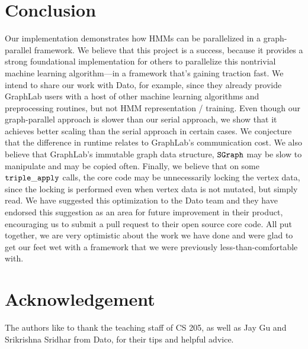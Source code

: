 \section{Conclusion}

Our implementation demonstrates how HMMs can be parallelized in a
graph-parallel framework.  We believe that this project is a success, because it provides a strong foundational implementation for others to parallelize this nontrivial machine learning algorithm---in a framework that's gaining traction fast.   We intend to share our work with Dato, for example, since they already provide GraphLab users with a host of other machine learning algorithms and preprocessing routines, but not HMM representation / training.  Even though our graph-parallel approach is slower than
our serial approach, we show that it achieves better scaling than the serial
approach in certain cases. We conjecture that the difference in runtime relates to GraphLab's communication cost.  We also believe that GraphLab's immutable graph data structure, $\tt{SGraph}$ may be slow to manipulate and may be copied often.  Finally, we  believe that on some $\tt{triple\_apply}$ calls, the core code may be unnecessarily locking the vertex data, since the locking is performed even when vertex data is not mutated, but simply read.   We have suggested this optimization to the Dato team and they have endorsed this suggestion as an area for future improvement in their product, encouraging us to submit a pull request to their open source core code.  All put together, we are very optimistic about the work we have done and were glad to get our feet wet with a framework that we were previously less-than-comfortable with.
\section*{Acknowledgement}

The authors like to thank the teaching staff of CS 205, as well as Jay Gu and
Srikrishna Sridhar from Dato, for their tips and helpful advice.
